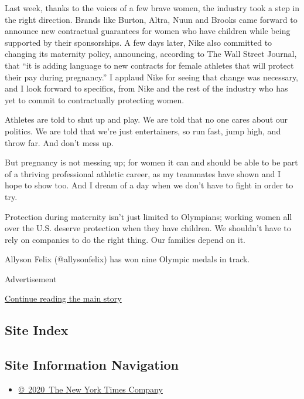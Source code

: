 Last week, thanks to the voices of a few brave women, the industry took
a step in the right direction. Brands like Burton, Altra, Nuun and
Brooks came forward to announce new contractual guarantees for women who
have children while being supported by their sponsorships. A few days
later, Nike also committed to changing its maternity policy, announcing,
according to The Wall Street Journal, that ``it is adding language to
new contracts for female athletes that will protect their pay during
pregnancy.'' I applaud Nike for seeing that change was necessary, and I
look forward to specifics, from Nike and the rest of the industry who
has yet to commit to contractually protecting women.

Athletes are told to shut up and play. We are told that no one cares
about our politics. We are told that we're just entertainers, so run
fast, jump high, and throw far. And don't mess up.

But pregnancy is not messing up; for women it can and should be able to
be part of a thriving professional athletic career, as my teammates have
shown and I hope to show too. And I dream of a day when we don't have to
fight in order to try.

Protection during maternity isn't just limited to Olympians; working
women all over the U.S. deserve protection when they have children. We
shouldn't have to rely on companies to do the right thing. Our families
depend on it.

Allyson Felix (@allysonfelix) has won nine Olympic medals in track.

Advertisement

\protect\hyperlink{after-bottom}{Continue reading the main story}

\hypertarget{site-index}{%
\subsection{Site Index}\label{site-index}}

\hypertarget{site-information-navigation}{%
\subsection{Site Information
Navigation}\label{site-information-navigation}}

\begin{itemize}
\tightlist
\item
  \href{https://help.nytimes3xbfgragh.onion/hc/en-us/articles/115014792127-Copyright-notice}{©~2020~The
  New York Times Company}
\end{itemize}


